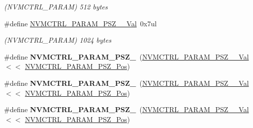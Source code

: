 \begin{DoxyCompactItemize}
\begin{DoxyCompactList}\small\item\em (N\+V\+M\+C\+T\+R\+L\+\_\+\+P\+A\+R\+A\+M) 512 bytes \end{DoxyCompactList}\item 
\hypertarget{group___s_a_m_l21___n_v_m_c_t_r_l_ga7bffb82ccc9a71552882baabdfa97b13}{}\#define \hyperlink{group___s_a_m_l21___n_v_m_c_t_r_l_ga7bffb82ccc9a71552882baabdfa97b13}{N\+V\+M\+C\+T\+R\+L\+\_\+\+P\+A\+R\+A\+M\+\_\+\+P\+S\+Z\+\_\+\_\+\+Val}~0x7ul\label{group___s_a_m_l21___n_v_m_c_t_r_l_ga7bffb82ccc9a71552882baabdfa97b13}

\begin{DoxyCompactList}\small\item\em (N\+V\+M\+C\+T\+R\+L\+\_\+\+P\+A\+R\+A\+M) 1024 bytes \end{DoxyCompactList}\item 
\hypertarget{group___s_a_m_l21___n_v_m_c_t_r_l_ga39d4fde607f28b120777885c44f2e0dd}{}\#define {\bfseries N\+V\+M\+C\+T\+R\+L\+\_\+\+P\+A\+R\+A\+M\+\_\+\+P\+S\+Z\+\_}~(\hyperlink{group___s_a_m_l21___n_v_m_c_t_r_l_ga9a83c6574dc48ac1c69701673922d2f3}{N\+V\+M\+C\+T\+R\+L\+\_\+\+P\+A\+R\+A\+M\+\_\+\+P\+S\+Z\+\_\+\_\+\+Val}       $<$$<$ \hyperlink{group___s_a_m_l21___n_v_m_c_t_r_l_gabec5624158a60a0f0d0b8a62afe18af8}{N\+V\+M\+C\+T\+R\+L\+\_\+\+P\+A\+R\+A\+M\+\_\+\+P\+S\+Z\+\_\+\+Pos})\label{group___s_a_m_l21___n_v_m_c_t_r_l_ga39d4fde607f28b120777885c44f2e0dd}

\item 
\hypertarget{group___s_a_m_l21___n_v_m_c_t_r_l_ga12d78d73359d02253053b1ef6ed067c6}{}\#define {\bfseries N\+V\+M\+C\+T\+R\+L\+\_\+\+P\+A\+R\+A\+M\+\_\+\+P\+S\+Z\+\_}~(\hyperlink{group___s_a_m_l21___n_v_m_c_t_r_l_ga10b4a62c2bab14a45967ee663cfbdd10}{N\+V\+M\+C\+T\+R\+L\+\_\+\+P\+A\+R\+A\+M\+\_\+\+P\+S\+Z\+\_\+\_\+\+Val}      $<$$<$ \hyperlink{group___s_a_m_l21___n_v_m_c_t_r_l_gabec5624158a60a0f0d0b8a62afe18af8}{N\+V\+M\+C\+T\+R\+L\+\_\+\+P\+A\+R\+A\+M\+\_\+\+P\+S\+Z\+\_\+\+Pos})\label{group___s_a_m_l21___n_v_m_c_t_r_l_ga12d78d73359d02253053b1ef6ed067c6}

\item 
\hypertarget{group___s_a_m_l21___n_v_m_c_t_r_l_ga4a6a6748a1eda03967d73ff67d8b4e5d}{}\#define {\bfseries N\+V\+M\+C\+T\+R\+L\+\_\+\+P\+A\+R\+A\+M\+\_\+\+P\+S\+Z\+\_}~(\hyperlink{group___s_a_m_l21___n_v_m_c_t_r_l_gae80b28e70177db78d7d5a0d748809192}{N\+V\+M\+C\+T\+R\+L\+\_\+\+P\+A\+R\+A\+M\+\_\+\+P\+S\+Z\+\_\+\_\+\+Val}      $<$$<$ \hyperlink{group___s_a_m_l21___n_v_m_c_t_r_l_gabec5624158a60a0f0d0b8a62afe18af8}{N\+V\+M\+C\+T\+R\+L\+\_\+\+P\+A\+R\+A\+M\+\_\+\+P\+S\+Z\+\_\+\+Pos})\label{group___s_a_m_l21___n_v_m_c_t_r_l_ga4a6a6748a1eda03967d73ff67d8b4e5d}


\end{DoxyCompactItemize}
